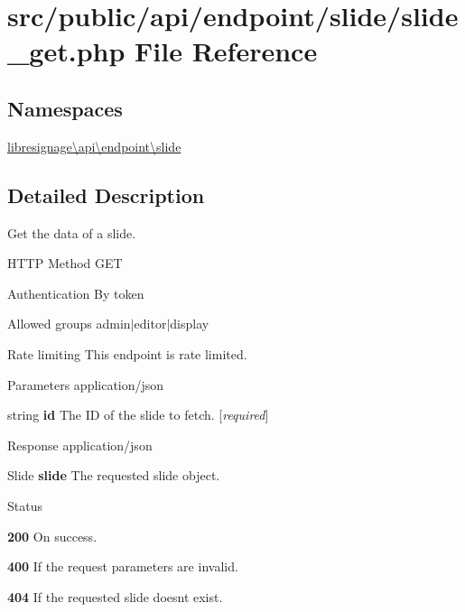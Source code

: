 \hypertarget{src_2public_2api_2endpoint_2slide_2slide__get_8php}{}\section{src/public/api/endpoint/slide/slide\+\_\+get.php File Reference}
\label{src_2public_2api_2endpoint_2slide_2slide__get_8php}
\subsection*{Namespaces}
\begin{DoxyCompactItemize}
\item 
 \hyperlink{namespacelibresignage_1_1api_1_1endpoint_1_1slide}{libresignage\textbackslash{}api\textbackslash{}endpoint\textbackslash{}slide}
\end{DoxyCompactItemize}


\subsection{Detailed Description}
Get the data of a slide.

\begin{DoxyParagraph}{H\+T\+TP Method}
G\+ET 
\end{DoxyParagraph}
\begin{DoxyParagraph}{Authentication}
By token 
\end{DoxyParagraph}
\begin{DoxyParagraph}{Allowed groups}
{\ttfamily admin$\vert$editor$\vert$display} 
\end{DoxyParagraph}
\begin{DoxyParagraph}{Rate limiting}
This endpoint is rate limited.
\end{DoxyParagraph}
\begin{DoxyParagraph}{Parameters}
application/json
\begin{DoxyItemize}
\item {\ttfamily string} {\bfseries id} The ID of the slide to fetch. \mbox{[}{\itshape required}\mbox{]}
\end{DoxyItemize}
\end{DoxyParagraph}
\begin{DoxyParagraph}{Response}
application/json
\begin{DoxyItemize}
\item {\ttfamily Slide} {\bfseries slide} The requested slide object.
\end{DoxyItemize}
\end{DoxyParagraph}
\begin{DoxyParagraph}{Status}

\begin{DoxyItemize}
\item {\bfseries 200} On success.
\item {\bfseries 400} If the request parameters are invalid.
\item {\bfseries 404} If the requested slide doesn\textquotesingle{}t exist. 
\end{DoxyItemize}
\end{DoxyParagraph}
